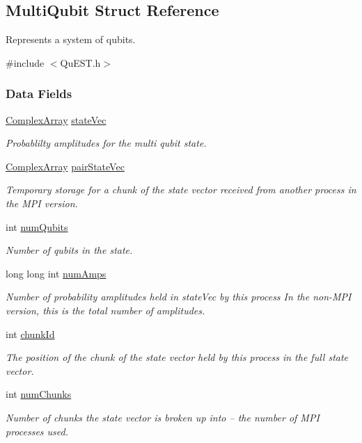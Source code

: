 \hypertarget{structMultiQubit}{}\subsection{Multi\+Qubit Struct Reference}
\label{structMultiQubit}


Represents a system of qubits.  




{\ttfamily \#include $<$Qu\+E\+S\+T.\+h$>$}

\subsubsection*{Data Fields}
\begin{DoxyCompactItemize}
\item 
\mbox{\hyperlink{structComplexArray}{Complex\+Array}} \mbox{\hyperlink{structMultiQubit_a45483190d6b01ef6b2f98f2bec9ab94f}{state\+Vec}}
\begin{DoxyCompactList}\small\item\em Probablilty amplitudes for the multi qubit state. \end{DoxyCompactList}\item 
\mbox{\hyperlink{structComplexArray}{Complex\+Array}} \mbox{\hyperlink{structMultiQubit_a76f7db4eab52d2b30f58f973ada809c5}{pair\+State\+Vec}}
\begin{DoxyCompactList}\small\item\em Temporary storage for a chunk of the state vector received from another process in the M\+PI version. \end{DoxyCompactList}\item 
int \mbox{\hyperlink{structMultiQubit_ab5b9795bdc6fb5855e1974dcbbaeb36f}{num\+Qubits}}
\begin{DoxyCompactList}\small\item\em Number of qubits in the state. \end{DoxyCompactList}\item 
long long int \mbox{\hyperlink{structMultiQubit_ae16f47d8b725c914fb7f66b6498d79db}{num\+Amps}}
\begin{DoxyCompactList}\small\item\em Number of probability amplitudes held in state\+Vec by this process In the non-\/\+M\+PI version, this is the total number of amplitudes. \end{DoxyCompactList}\item 
int \mbox{\hyperlink{structMultiQubit_ab10c88249fa3825d6227ceec01d37e37}{chunk\+Id}}
\begin{DoxyCompactList}\small\item\em The position of the chunk of the state vector held by this process in the full state vector. \end{DoxyCompactList}\item 
int \mbox{\hyperlink{structMultiQubit_acd43f2f57991709c9e94f73662c972b2}{num\+Chunks}}
\begin{DoxyCompactList}\small\item\em Number of chunks the state vector is broken up into -- the number of M\+PI processes used. \end{DoxyCompactList}\end{DoxyCompactItemize}


